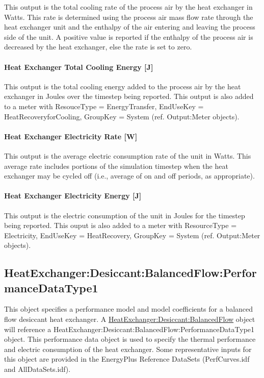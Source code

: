 This output is the total cooling rate of the process air by the heat exchanger in Watts. This rate is determined using the process air mass flow rate through the heat exchanger unit and the enthalpy of the air entering and leaving the process side of the unit. A positive value is reported if the enthalpy of the process air is decreased by the heat exchanger, else the rate is set to zero.

\paragraph{Heat Exchanger Total Cooling Energy {[}J{]}}\label{heat-exchanger-total-cooling-energy-j-2}

This output is the total cooling energy added to the process air by the heat exchanger in Joules over the timestep being reported. This output is also added to a meter with ResouceType = EnergyTransfer, EndUseKey = HeatRecoveryforCooling, GroupKey = System (ref. Output:Meter objects).

\paragraph{Heat Exchanger Electricity Rate {[}W{]}}\label{heat-exchanger-electric-power-w-2}

This output is the average electric consumption rate of the unit in Watts. This average rate includes portions of the simulation timestep when the heat exchanger may be cycled off (i.e., average of on and off periods, as appropriate).

\paragraph{Heat Exchanger Electricity Energy {[}J{]}}\label{heat-exchanger-electric-energy-j-2}

This output is the electric consumption of the unit in Joules for the timestep being reported. This ouput is also added to a meter with ResourceType = Electricity, EndUseKey = HeatRecovery, GroupKey = System (ref. Output:Meter objects).

\subsection{HeatExchanger:Desiccant:BalancedFlow:PerformanceDataType1}\label{heatexchangerdesiccantbalancedflowperformancedatatype1}

This object specifies a performance model and model coefficients for a balanced flow desiccant heat exchanger. A \hyperref[heatexchangerdesiccantbalancedflow]{HeatExchanger:Desiccant:BalancedFlow} object will reference a HeatExchanger:Desiccant:BalancedFlow:PerformanceDataType1 object. This performance data object is used to specify the thermal performance and electric consumption of the heat exchanger. Some representative inputs for this object are provided in the EnergyPlus Reference DataSets (PerfCurves.idf and AllDataSets.idf).

